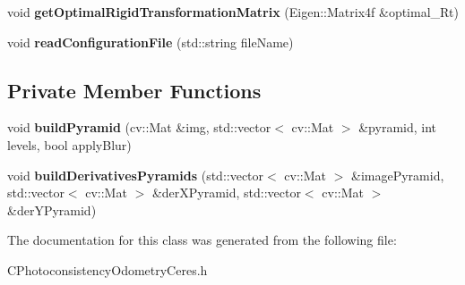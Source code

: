 \begin{DoxyCompactItemize}
\item 
\hypertarget{class_photoconsistency_odometry_ceres_1_1_c_photoconsistency_odometry_ceres_a8c1ac216b428ce83be3a65caa3ede97d}{
void {\bfseries getOptimalRigidTransformationMatrix} (Eigen::Matrix4f \&optimal\_\-Rt)}
\label{class_photoconsistency_odometry_ceres_1_1_c_photoconsistency_odometry_ceres_a8c1ac216b428ce83be3a65caa3ede97d}

\item 
\hypertarget{class_photoconsistency_odometry_ceres_1_1_c_photoconsistency_odometry_ceres_a75350ca8a5de4aa39879dd83433ba700}{
void {\bfseries readConfigurationFile} (std::string fileName)}
\label{class_photoconsistency_odometry_ceres_1_1_c_photoconsistency_odometry_ceres_a75350ca8a5de4aa39879dd83433ba700}

\end{DoxyCompactItemize}
\subsection*{Private Member Functions}
\begin{DoxyCompactItemize}
\item 
\hypertarget{class_photoconsistency_odometry_ceres_1_1_c_photoconsistency_odometry_ceres_af391ca291b70b1e531cc74a60ba40d46}{
void {\bfseries buildPyramid} (cv::Mat \&img, std::vector$<$ cv::Mat $>$ \&pyramid, int levels, bool applyBlur)}
\label{class_photoconsistency_odometry_ceres_1_1_c_photoconsistency_odometry_ceres_af391ca291b70b1e531cc74a60ba40d46}

\item 
\hypertarget{class_photoconsistency_odometry_ceres_1_1_c_photoconsistency_odometry_ceres_a7940f59d11a4b104c9fdc44570e2a1c9}{
void {\bfseries buildDerivativesPyramids} (std::vector$<$ cv::Mat $>$ \&imagePyramid, std::vector$<$ cv::Mat $>$ \&derXPyramid, std::vector$<$ cv::Mat $>$ \&derYPyramid)}
\label{class_photoconsistency_odometry_ceres_1_1_c_photoconsistency_odometry_ceres_a7940f59d11a4b104c9fdc44570e2a1c9}

\end{DoxyCompactItemize}


The documentation for this class was generated from the following file:\begin{DoxyCompactItemize}
\item 
CPhotoconsistencyOdometryCeres.h\end{DoxyCompactItemize}
